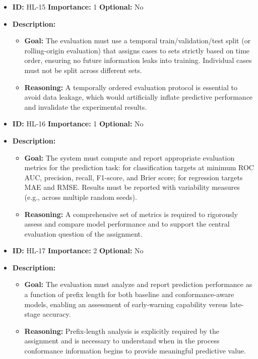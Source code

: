 \documentclass[12pt,a4paper]{article}
\begin{document}
\begin{itemize}
    \item \textbf{ID:} HL-15
 \textbf{Importance:} 1
 \textbf{Optional:} No
    \item \textbf{Description:}
    \begin{itemize}
        \item \textbf{Goal:} The evaluation must use a temporal train/validation/test split (or rolling-origin evaluation) that assigns cases to sets strictly based on time order, ensuring no future information leaks into training. Individual cases must not be split across different sets.
        \item \textbf{Reasoning:} A temporally ordered evaluation protocol is essential to avoid data leakage, which would artificially inflate predictive performance and invalidate the experimental results.
    \end{itemize}
\end{itemize}
\vspace{1.5em}

\begin{itemize}
    \item \textbf{ID:} HL-16
 \textbf{Importance:} 1
 \textbf{Optional:} No
    \item \textbf{Description:}
    \begin{itemize}
        \item \textbf{Goal:} The system must compute and report appropriate evaluation metrics for the prediction task: for classification targets at minimum ROC AUC, precision, recall, F1-score, and Brier score; for regression targets MAE and RMSE. Results must be reported with variability measures (e.g., across multiple random seeds).
        \item \textbf{Reasoning:} A comprehensive set of metrics is required to rigorously assess and compare model performance and to support the central evaluation question of the assignment.
    \end{itemize}
\end{itemize}
\vspace{1.5em}

\begin{itemize}
    \item \textbf{ID:} HL-17
 \textbf{Importance:} 2
 \textbf{Optional:} No
    \item \textbf{Description:}
    \begin{itemize}
        \item \textbf{Goal:} The evaluation must analyze and report prediction performance as a function of prefix length for both baseline and conformance-aware models, enabling an assessment of early-warning capability versus late-stage accuracy.
        \item \textbf{Reasoning:} Prefix-length analysis is explicitly required by the assignment and is necessary to understand when in the process conformance information begins to provide meaningful predictive value.
    \end{itemize}
\end{itemize}
\vspace{1.5em}
\end{document}
